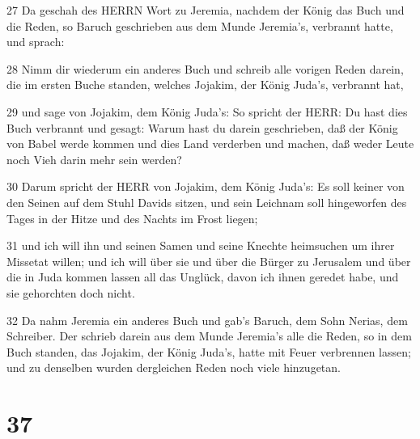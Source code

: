\par 27 Da geschah des HERRN Wort zu Jeremia, nachdem der König das Buch und die Reden, so Baruch geschrieben aus dem Munde Jeremia's, verbrannt hatte, und sprach:
\par 28 Nimm dir wiederum ein anderes Buch und schreib alle vorigen Reden darein, die im ersten Buche standen, welches Jojakim, der König Juda's, verbrannt hat,
\par 29 und sage von Jojakim, dem König Juda's: So spricht der HERR: Du hast dies Buch verbrannt und gesagt: Warum hast du darein geschrieben, daß der König von Babel werde kommen und dies Land verderben und machen, daß weder Leute noch Vieh darin mehr sein werden?
\par 30 Darum spricht der HERR von Jojakim, dem König Juda's: Es soll keiner von den Seinen auf dem Stuhl Davids sitzen, und sein Leichnam soll hingeworfen des Tages in der Hitze und des Nachts im Frost liegen;
\par 31 und ich will ihn und seinen Samen und seine Knechte heimsuchen um ihrer Missetat willen; und ich will über sie und über die Bürger zu Jerusalem und über die in Juda kommen lassen all das Unglück, davon ich ihnen geredet habe, und sie gehorchten doch nicht.
\par 32 Da nahm Jeremia ein anderes Buch und gab's Baruch, dem Sohn Nerias, dem Schreiber. Der schrieb darein aus dem Munde Jeremia's alle die Reden, so in dem Buch standen, das Jojakim, der König Juda's, hatte mit Feuer verbrennen lassen; und zu denselben wurden dergleichen Reden noch viele hinzugetan.

\chapter{37}

